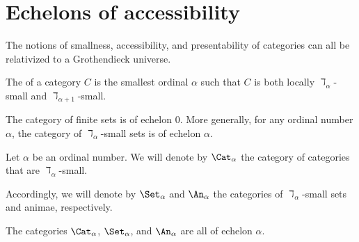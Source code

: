 
\section{Echelons of accessibility}%
\label{sec:echelonsofaccessibility}

The notions of smallness,
accessibility, and presentability of categories
can all be relativized to a Grothendieck universe.

\begin{definition}
	The  of a category $ C $ is
	the smallest ordinal $ \alpha $ such that
	$ C $ is both
	locally $ \daleth_{\alpha} $-small
	and $ \daleth_{\alpha + 1} $-small.
\end{definition}

\begin{eg}
	The category of finite sets is 
	of echelon $ 0 $.
	More generally, for any ordinal number $ \alpha $,
	the category of $ \daleth_{\alpha} $-small sets is
	of echelon $ \alpha $.
\end{eg}

\begin{notation}
	Let $ \alpha $ be an ordinal number.
	We will denote by $ \Cat_{\alpha} $
	the category of categories that are
	$ \daleth_{\alpha} $-small.

	Accordingly, we will denote by
	$ \Set_{\alpha} $ and $ \An_{\alpha} $
	the categories of $ \daleth_{\alpha} $-small
	sets and animae, respectively.

	The categories $ \Cat_{\alpha} $, $ \Set_{\alpha} $, and $ \An_{\alpha} $
	are all of echelon $ \alpha $.
\end{notation}

